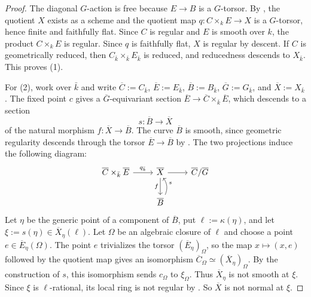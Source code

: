 \documentclass[10pt,abstract=true]{scrartcl}
\numberwithin{equation}{section}
\theoremstyle{definition}
\theoremstyle{remark}
\begin{document}
\begin{proof}
  The diagonal $G$-action is free because $E\to B$ is a $G$-torsor.
  By \cite[Tag~\href{https://stacks.math.columbia.edu/tag/07S7}{07S7}]{StacksProject}, the quotient $X$ exists as a scheme and the quotient map $q\colon C\times_kE\to X$ is a $G$-torsor, hence finite and faithfully flat.
  Since $C$ is regular and $E$ is smooth over $k$, the product $C\times_kE$ is regular.
  Since $q$ is faithfully flat, $X$ is regular by descent.
  If $C$ is geometrically reduced, then $C_{\bar k}\times_{\bar k}E_{\bar k}$ is reduced, and reducedness descends to $X_{\bar k}$.
  This proves \textup{(1)}.

  For \textup{(2)}, work over $\bar k$ and write $\overline C:=C_{\bar k}$, $\overline E:=E_{\bar k}$, $\overline B:=B_{\bar k}$, $\overline G:=G_{\bar k}$, and $\overline X:=X_{\bar k}$.
  The fixed point $c$ gives a $\overline G$-equivariant section $\overline E\to\overline C\times_{\bar k}\overline E$, which descends to a section
  \[
    s\colon\overline B\longrightarrow\overline X
  \]
  of the natural morphism $f\colon\overline X\to\overline B$.
  The curve $\overline B$ is smooth, since geometric regularity descends through the torsor $\overline E\to\overline B$ by \cite[Tag~\href{https://stacks.math.columbia.edu/tag/07NH}{07NH}]{StacksProject}.
  The two projections induce the following diagram:
  \[
    \begin{tikzcd}
      \overline C \times_{\bar k} \overline E \rar["q_{\bar k}"] & \overline X \rar \dar["f"'] & \overline C/\overline G \\
      & \overline B \ar[u,bend right,"s"']
    \end{tikzcd}
  \]
  Let $\eta$ be the generic point of a component of $\overline B$, put $\ell:=\kappa(\eta)$, and let $\xi:=s(\eta)\in\overline X_\eta(\ell)$.
  Let $\Omega$ be an algebraic closure of $\ell$ and choose a point $e\in\overline E_\eta(\Omega)$.
  The point $e$ trivializes the torsor $(\overline E_\eta)_\Omega$, so the map $x\mapsto(x,e)$ followed by the quotient map gives an isomorphism $\overline C_\Omega\simeq(\overline X_\eta)_\Omega$.
  By the construction of $s$, this isomorphism sends $c_\Omega$ to $\xi_\Omega$.
  Thus $\overline X_\eta$ is not smooth at $\xi$.
  Since $\xi$ is $\ell$-rational, its local ring is not regular by \cite[Tag~\href{https://stacks.math.columbia.edu/tag/00TV}{00TV}]{StacksProject}.
  So $\overline X$ is not normal at $\xi$.

\end{proof}
\end{document}

